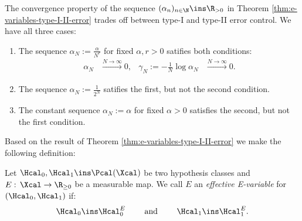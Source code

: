 \begin{Rem}
    The convergence property of the sequence $(\alpha_n)_{n \in \N} \ins \R_{>0}$ in Theorem \ref{thm:e-variables-type-I-II-error} trades off between
    type-I and type-II error control. We have all three cases:
    \begin{enumerate}
        \item The sequence $\alpha_N:=\frac{\alpha}{N^r}$ for fixed $\alpha,r >0$ satifies both conditions:
             \begin{align*} 
                 \alpha_N &\stackrel{N \to \infty}{\longrightarrow} 0, &\gamma_N:=-\frac{1}{N} \log \alpha_N &\stackrel{N \to \infty}{\longrightarrow} 0. 
         \end{align*}
     \item The sequence $\alpha_N:=\frac{1}{2^N}$ satifies the first, but not the second condition.
     \item The constant sequence $\alpha_N:=\alpha$ for fixed $\alpha > 0$ satisfies the second, but not the first condition.
    \end{enumerate}
\end{Rem}

Based on the result of Theorem \ref{thm:e-variables-type-I-II-error} we make the following definition:

\begin{Def}
 Let $\Hcal_0,\Hcal_1 \ins \Pcal(\Xcal)$ be two hypothesis classes and $E:\, \Xcal \to \R_{\ge0}$ be a measurable map.
 We call $E$ an \emph{effective E-variable} for $(\Hcal_0,\Hcal_1)$ if:
 \[ \Hcal_0 \ins \Hcal_0^E \qquad \text{ and } \qquad \Hcal_1 \ins \Hcal_1^E. \]
\end{Def}

